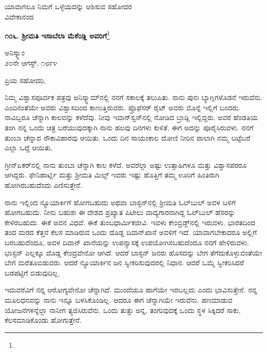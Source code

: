\vspace{-0.3cm}

{\flushright
ಯಾವಾಗಲೂ ನಿಮಗೆ ಒಳ್ಳೆಯದನ್ನು ಆಶಿಸುವ ಸಹೋದರ\\ವಿವೇಕಾನಂದ\par}

\begin{center}
\textbf{೧೦೬. ಶ‍್ರೀಮತಿ ಇಸಾಬೆಲಾ ಮೆಕೆಂಡ್ಲಿ ಅವರಿಗೆ}\footnote{}
\end{center}

\vspace{-0.5cm}

\begin{flushright}
ಅನಿಸ್ಕ್ವಾಂ\\೨೦ನೇ ಆಗಸ್ಟ್, ೧೮೯೪
\end{flushright}

\vspace{-0.5cm}

\noindent
ಪ್ರಿಯ ಸಹೋದರಿ,

ನಿಮ್ಮ ವಿಶ್ವಾಸಪೂರ್ವಕ ಪತ್ರವು ಅನಿಸ್ಕ್ವಾಮ್‌ನಲ್ಲಿ ನನಗೆ ಸಕಾಲಕ್ಕೆ ತಲುಪಿತು. ನಾನು ಪುನಃ ಬ್ಯಾಗ್ಲಿಗಳೊಡನೆ ಇರುವೆನು. ಎಂದಿನಂತೆಯೇ ಅವರು ವಿಶ್ವಾಸದಿಂದ ಕಾಣುತ್ತಿರುವರು. ಪ್ರೊಫೆಸರ್ ರೈಟ್ ಅವರು ಮೊನ್ನೆ ಇಲ್ಲಿಗೆ ಬಂದರು. ನಾವಿಬ್ಬರೂ ಚೆನ್ನಾಗಿ ಕಾಲವನ್ನು ಕಳೆದೆವು. ನೀವು ಇವಾನ್‌ಸ್ವನ್‌ನಲ್ಲಿ ನೋಡಿದ ಬ್ರಾಡ್ಲಿ ಇಲ್ಲಿದ್ದರು. ಅವರ ಹೆಂಡತಿಯ ತಂಗಿ ನನ್ನ ಒಂದು ಚಿತ್ರ ಬರೆಯುವುದಕ್ಕಾಗಿ ನಾನು ಹಲವು ದಿನಗಳು ಕುಳಿತೆ. ಈಗ ಅದನ್ನು ಪೂರೈಸಿರುವಳು. ನನಗೆ ತುಂಬಾ ಚೆನ್ನಾದ ನೌಕಾವಿಹಾರವು ಆಯಿತು. ಒಂದು ದಿನ ಸಾಯಂಕಾಲ ದೋಣಿ ನೀರಿನ ಪಾಲಾಗಿ ನಮ್ಮ ಬಟ್ಟೆಬರೆ ಎಲ್ಲಾ ಒದ್ದೆ ಆಯಿತು.

ಗ್ರೀನ್‌ಏಕರ್‌ನಲ್ಲಿ ನಾನು ತುಂಬಾ ಚೆನ್ನಾಗಿ ಕಾಲ ಕಳೆದೆ. ಅವರೆಲ್ಲಾ ಅಷ್ಟು ಉತ್ಸಾಹಿಗಳೂ ಮತ್ತು ವಿಶ್ವಾಸಪರರೂ ಆಗಿದ್ದರು. ಫೇನಿಹಾರ್ಟ್ಲಿ ಮತ್ತು ಶ‍್ರೀಮತಿ ಮಿಲ್ಸ್ ಇವರು ಇಷ್ಟು ಹೊತ್ತಿಗೆ ತಮ್ಮ ಊರಿಗೆ ಹಿಂತಿರುಗಿ ಹೋಗಿರಬಹುದೆಂದು ಎಣಿಸುತ್ತೇನೆ.

ನಾನು ಇಲ್ಲಿಂದ ನ್ಯೂಯಾರ್ಕಿಗೆ ಹೋಗಬಹುದು ಅಥವಾ ಬಾಸ್ಟನ್‌ನಲ್ಲಿ ಶ‍್ರೀಮತಿ ಓಲ್‌ಬುಲ್ ಅವಳ ಬಳಿಗೆ ಹೋಗಬಹುದು. ನೀನು ಬಹುಶಃ ಈ ದೇಶದ ಪ್ರಖ್ಯಾತ ಪಿಟೀಲು ವಾದ್ಯಗಾರನಾಗಿದ್ದ ಓಲ್‌ಬುಲ್ ಹೆಸರನ್ನು ಕೇಳಿರಬಹುದು. ಈಕೆ ಅವನ ವಿಧವೆ. ಈಕೆ ತುಂಬಧಾರ್ಮಿಕಜೀವಿ. ಇವಳು ಕೇಂಬ್ರಿಡ್ಜ್‌ನಲ್ಲಿ ಇರುವಳು. ಭಾರತದಿಂದ ತಂದ ಮರದ ಕೆತ್ತನೆ ಕೆಲಸ ಮಾಡಿರುವ ಒಂದು ದೊಡ್ಡ ದಿವಾನ್‌ಖಾನೆ ಅವಳಿಗೆ ಇದೆ. ಯಾವಾಗಬೇಕಾದರೂ ಅಲ್ಲಿಗೆ ಬರಬಹುದೆಂದೂ, ಅವಳ ದಿವಾನ್ ಖಾನೆಯನ್ನು ಉಪನ್ಯಾಸಕ್ಕೆ ಉಪಯೋಗಿಸಬಹುದೆಂದೂ ನನಗೆ ಹೇಳಿರುವಳು. ಭಾಸ್ಟನ್ ಎಲ್ಲಕ್ಕೂ ದೊಡ್ಡ ಕೇಂದ್ರವೇನೋ ಆಗಿದೆ. ಆದರೆ ಬಾಸ್ಟನ್ ಜನರು ಹೊಸದನ್ನು ಬೇಗ ತೆಗೆದುಕೊಳ್ಳುವಂತೆಯೇ ಬೇಗ ಮರೆತೂಬಿಡುವರು. ಆದರೆ ನ್ಯೂಯಾರ್ಕಿನ ಜನ ಸ್ವೀಕರಿಸುವುದರಲ್ಲಿ ನಿಧಾನ. ಆದರೆ ಒಮ್ಮೆ ಸ್ವೀಕರಿಸಿದರೆ ಬಡಪಟ್ಟಿಗೆ ಬಿಡುವುದಿಲ್ಲ.

ಇದುವರೆವಿಗೆ ನನ್ನ ಆರೋಗ್ಯವೇನೋ ಚೆನ್ನಾಗಿದೆ. ಮುಂದೆಯೂ ಹಾಗೆಯೇ ಇರಬಲ್ಲದು ಎಂದು ಭಾವಿಸುತ್ತೇನೆ. ನನ್ನ ಮೂಲಧನವನ್ನು ನಾನು ಇನ್ನೂ ಬಳಸಿಕೊಂಡಿಲ್ಲ. ಆದರೂ ಈಗ ಚೆನ್ನಾಗಿಯೇ ಇರುವೆನು. ಹಣಮಾಡುವ ಯೋಜನೆಗಳನ್ನೆಲ್ಲಾ ನಾನೀಗ ತ್ಯಜಿಸಿರುವೆನು. ಒಂದು ತುತ್ತು ಅನ್ನ, ತಂಗುವುದಕ್ಕೆ ಒಂದು ಸ್ಥಳ ಸಿಕ್ಕಿದರೆ ಸಾಕು, ಕೆಲಸಮಾಡಿಕೊಂಡು ಹೋಗುತ್ತೇನೆ.

